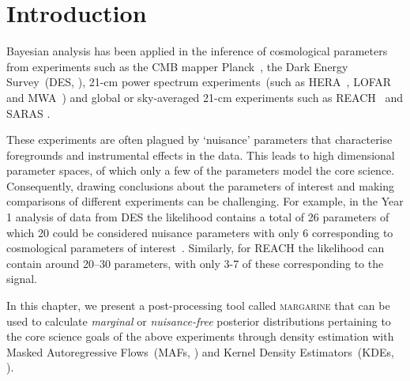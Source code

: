 \section{Introduction}


Bayesian analysis has been applied in the inference of cosmological parameters from experiments such as the CMB mapper Planck~\cite{Planck2018}, the Dark Energy Survey~(DES, \citep{DES_Year1_2018, DES_year3_2021, DES_year3}), 21-cm power spectrum experiments~(such as HERA~\citep{HERA_2022b}, LOFAR~\citep{Ghara_LOFAR_2020, Mondal_LOFAR_2020} and MWA~\citep{Greig_MWA_2020, Ghara_MWA_2021}) and global or sky-averaged 21-cm experiments such as
REACH~\citep{Anstey_REACH_2021} and SARAS \citep{Bevins_SARAS2_2022, Bevins_saras3_2022}. 

These experiments are often plagued by `nuisance' parameters that characterise foregrounds and instrumental effects in the data. This leads to high dimensional parameter spaces, of which only a few of the parameters model the core science. Consequently, drawing conclusions about the parameters of interest and making comparisons of different experiments can be challenging. For example, in the Year 1 analysis of data from DES the likelihood contains a total of 26 parameters of which 20 could be considered nuisance parameters with only 6 corresponding to cosmological parameters of interest~\citep{DES_Year1_2018}. Similarly, for REACH \citep{Anstey_REACH_2021, de_lera_acedo_reach_2022} the likelihood can contain around 20–30 parameters, with only 3-7 of these corresponding to the signal.

In this chapter, we present a post-processing tool called \textsc{margarine} that can be used to calculate \emph{marginal} or \emph{nuisance-free} posterior distributions pertaining to the core science goals of the above experiments through density estimation with Masked Autoregressive Flows~(MAFs, \cite{Papamarkarios_MAF_2017}) and Kernel Density Estimators~(KDEs, \cite{rosenblatt_KDE_1956, parzen_KDE_1962}).

